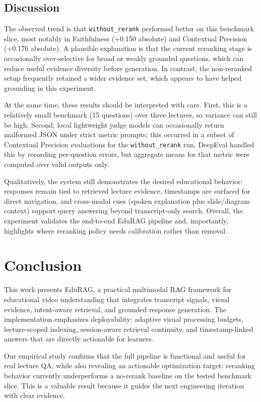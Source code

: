 \documentclass[conference]{IEEEtran}
\begin{document}
    \subsection{Discussion}
    The observed trend is that \texttt{without\_rerank} performed better on this benchmark slice, most notably in Faithfulness (+0.150 absolute) and Contextual Precision (+0.176 absolute). A plausible explanation is that the current reranking stage is occasionally over-selective for broad or weakly grounded questions, which can reduce useful evidence diversity before generation. In contrast, the non-reranked setup frequently retained a wider evidence set, which appears to have helped grounding in this experiment.

    At the same time, these results should be interpreted with care. First, this is a relatively small benchmark (15 questions) over three lectures, so variance can still be high. Second, local lightweight judge models can occasionally return malformed JSON under strict metric prompts; this occurred in a subset of Contextual Precision evaluations for the \texttt{without\_rerank} run. DeepEval handled this by recording per-question errors, but aggregate means for that metric were computed over valid outputs only.

    Qualitatively, the system still demonstrates the desired educational behavior: responses remain tied to retrieved lecture evidence, timestamps are surfaced for direct navigation, and cross-modal cues (spoken explanation plus slide/diagram context) support query answering beyond transcript-only search. Overall, the experiment validates the end-to-end EduRAG pipeline and, importantly, highlights where reranking policy needs calibration rather than removal.

    \section{Conclusion}
    This work presents EduRAG, a practical multimodal RAG framework for educational video understanding that integrates transcript signals, visual evidence, intent-aware retrieval, and grounded response generation. The implementation emphasizes deployability: adaptive visual processing budgets, lecture-scoped indexing, session-aware retrieval continuity, and timestamp-linked answers that are directly actionable for learners.

    Our empirical study confirms that the full pipeline is functional and useful for real lecture QA, while also revealing an actionable optimization target: reranking behavior currently underperforms a no-rerank baseline on the tested benchmark slice. This is a valuable result because it guides the next engineering iteration with clear evidence.
\end{document}
